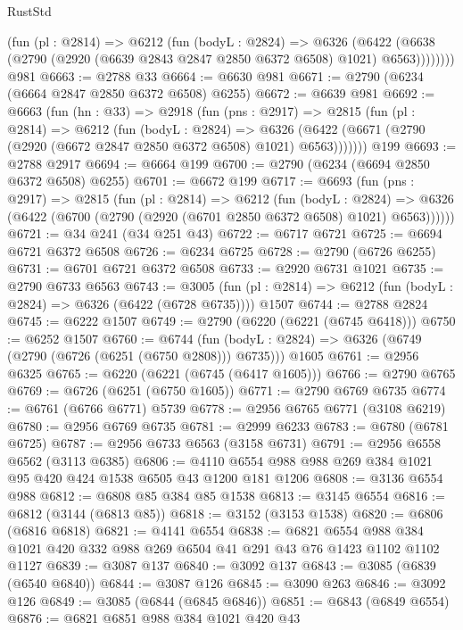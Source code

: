 \begin{lexlean}{RustStd}
\begin{coremodule}
          (fun (pl : @2814) =>
          @6212
            (fun (bodyL : @2824) =>
            @6326
              (@6422 (@6638 (@2790 (@2920 (@6639 @2843 @2847 @2850 @6372 @6508) @1021) @6563))))))))
    @981
@6663 := @2788 @33
@6664 := @6630 @981
@6671 := @2790 (@6234 (@6664 @2847 @2850 @6372 @6508) @6255)
@6672 := @6639 @981
@6692 := @6663
    (fun (hn : @33) =>
    @2918
      (fun (pns : @2917) =>
      @2815
        (fun (pl : @2814) =>
        @6212
          (fun (bodyL : @2824) =>
          @6326 (@6422 (@6671 (@2790 (@2920 (@6672 @2847 @2850 @6372 @6508) @1021) @6563)))))))
    @199
@6693 := @2788 @2917
@6694 := @6664 @199
@6700 := @2790 (@6234 (@6694 @2850 @6372 @6508) @6255)
@6701 := @6672 @199
@6717 := @6693
    (fun (pns : @2917) =>
    @2815
      (fun (pl : @2814) =>
      @6212
        (fun (bodyL : @2824) =>
        @6326 (@6422 (@6700 (@2790 (@2920 (@6701 @2850 @6372 @6508) @1021) @6563))))))
@6721 := @34 @241 (@34 @251 @43)
@6722 := @6717 @6721
@6725 := @6694 @6721 @6372 @6508
@6726 := @6234 @6725
@6728 := @2790 (@6726 @6255)
@6731 := @6701 @6721 @6372 @6508
@6733 := @2920 @6731 @1021
@6735 := @2790 @6733 @6563
@6743 := @3005
    (fun (pl : @2814) => @6212 (fun (bodyL : @2824) => @6326 (@6422 (@6728 @6735))))
    @1507
@6744 := @2788 @2824
@6745 := @6222 @1507
@6749 := @2790 (@6220 (@6221 (@6745 @6418)))
@6750 := @6252 @1507
@6760 := @6744
    (fun (bodyL : @2824) => @6326 (@6749 (@2790 (@6726 (@6251 (@6750 @2808))) @6735)))
    @1605
@6761 := @2956 @6325
@6765 := @6220 (@6221 (@6745 (@6417 @1605)))
@6766 := @2790 @6765
@6769 := @6726 (@6251 (@6750 @1605))
@6771 := @2790 @6769 @6735
@6774 := @6761 (@6766 @6771) @5739
@6778 := @2956 @6765 @6771 (@3108 @6219)
@6780 := @2956 @6769 @6735
@6781 := @2999 @6233
@6783 := @6780 (@6781 @6725)
@6787 := @2956 @6733 @6563 (@3158 @6731)
@6791 := @2956 @6558 @6562 (@3113 @6385)
@6806 := @4110 @6554 @988 @988 @269 @384 @1021 @95 @420 @424 @1538 @6505 @43 @1200 @181 @1206
@6808 := @3136 @6554 @988
@6812 := @6808 @85 @384 @85 @1538
@6813 := @3145 @6554
@6816 := @6812 (@3144 (@6813 @85))
@6818 := @3152 (@3153 @1538)
@6820 := @6806 (@6816 @6818)
@6821 := @4141 @6554
@6838 := @6821
    @6554
    @988
    @384
    @1021
    @420
    @332
    @988
    @269
    @6504
    @41
    @291
    @43
    @76
    @1423
    @1102
    @1102
    @1127
@6839 := @3087 @137
@6840 := @3092 @137
@6843 := @3085 (@6839 (@6540 @6840))
@6844 := @3087 @126
@6845 := @3090 @263
@6846 := @3092 @126
@6849 := @3085 (@6844 (@6845 @6846))
@6851 := @6843 (@6849 @6554)
@6876 := @6821
    @6851
    @988
    @384
    @1021
    @420
    @43

\end{coremodule}
\end{lexlean}
